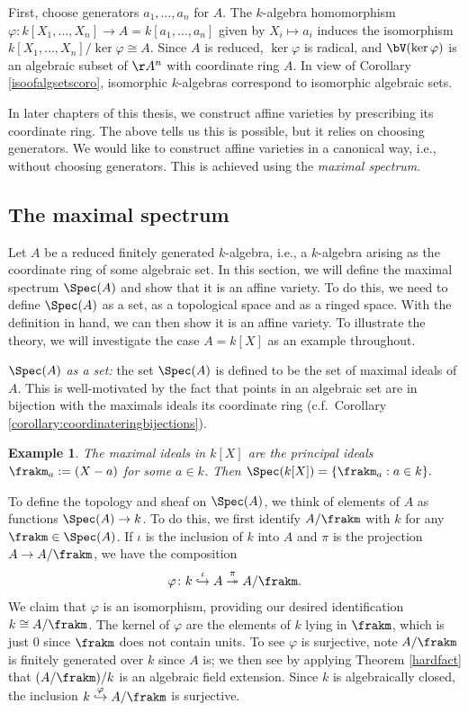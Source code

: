 \documentclass[12pt]{amsart}
\theoremstyle{plain}
\newtheorem{example}[theorem]{Example}
\begin{document}
First, choose generators $a_1, \ldots, a_n$ for $A$.
The $k$-algebra homomorphism $\varphi : k[X_1, \ldots, X_n] \to A=k[a_1,\ldots,a_n]$ given by $X_i \mapsto a_i$ induces the isomorphism $k[X_1, \ldots, X_n] / \ker \varphi \cong A$.
Since $A$ is reduced, $\ker\varphi$ is radical, and $\bV(\ker \varphi)$ is an algebraic subset of $\AA^n$ with coordinate ring $A$.
In view of Corollary \ref{isoofalgsetscoro}, isomorphic $k$-algebras correspond to isomorphic algebraic sets.

In later chapters of this thesis, we construct affine varieties by prescribing its coordinate ring.
The above tells us this is possible, but it relies on choosing generators.
We would like to construct affine varieties in a canonical way, i.e., without choosing generators.
This is achieved using the \emph{maximal spectrum}.





\subsection{The maximal spectrum}\label{section:themaximalspectrum}
Let $A$ be a reduced finitely generated $k$-algebra, i.e., a $k$-algebra arising as the coordinate ring of some algebraic set.
In this section, we will define the maximal spectrum $\Spec(A)$ and show that it is an affine variety.
To do this, we need to define $\Spec(A)$ as a set, as a topological space and as a ringed space.
With the definition in hand, we can then show it is an affine variety.
To illustrate the theory, we will investigate the case $A=k[X]$ as an example throughout.

\emph{$\Spec(A)$ as a set:}
the set $\Spec(A)$ is defined to be the set of maximal ideals of $A$.
This is well-motivated by the fact that points in an algebraic set are in bijection with the maximals ideals its coordinate ring (c.f.\ Corollary \ref{corollary:coordinateringbijections}).

\begin{example}
The maximal ideals in $k[X]$ are the principal ideals $\frakm_a:=(X-a)$ for some $a\in k$.
Then $\Spec(k[X]) = \{\frakm_a : a \in k\}.$
\end{example}

To define the topology and sheaf on $\Spec(A)$, we think of elements of $A$ as functions $\Spec(A) \to k$.
To do this, we first identify $A/\frakm$ with $k$ for any $\frakm \in \Spec(A)$.
If $\iota$ is the inclusion of $k$ into $A$ and $\pi$ is the projection $A \to A/\frakm$, we have the composition
$$\varphi \colon k \overset{\iota}{\hookrightarrow} A \overset{\pi}{\twoheadrightarrow} A/\frakm.$$
We claim that $\varphi$ is an isomorphism, providing our desired identification $k \cong A/\frakm$.
The kernel of $\varphi$ are the elements of $k$ lying in $\frakm$, which is just $0$ since $\frakm$ does not contain units.
To see $\varphi$ is surjective, note $A/\frakm$ is finitely generated over $k$ since $A$ is;
we then see by applying Theorem \ref{hardfact} that $(A/\frakm)/k$ is an algebraic field extension.
Since $k$ is algebraically closed, the inclusion $k \overset{\varphi}{\hookrightarrow} A/\frakm$ is surjective.
\end{document}
